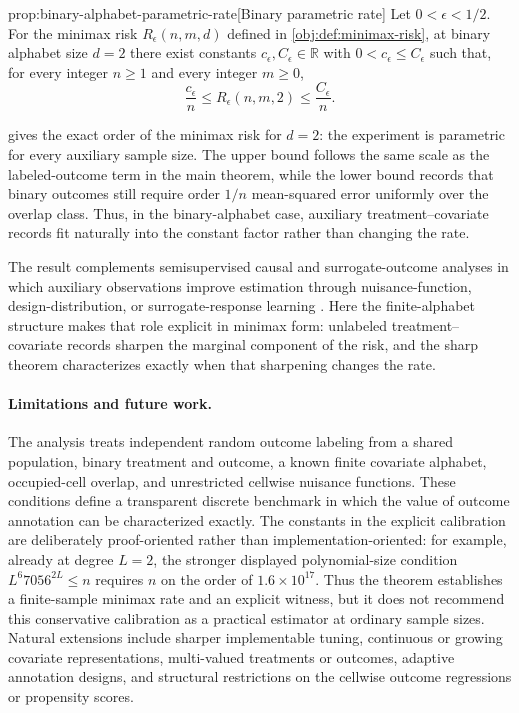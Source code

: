 \begin{theoremv}{prop:binary-alphabet-parametric-rate}[Binary parametric rate]
Let \(0<\epsilon<1/2\). For the minimax risk \(R_\epsilon(n,m,d)\) defined in \cref{obj:def:minimax-risk}, at binary alphabet size \(d=2\) there exist constants \(c_\epsilon,C_\epsilon\in\mathbb R\) with \(0<c_\epsilon\le C_\epsilon\) such that, for every integer \(n\ge1\) and every integer \(m\ge0\),
\[
\frac{c_\epsilon}{n}\le R_\epsilon(n,m,2)\le \frac{C_\epsilon}{n}.
\]
\end{theoremv}

 gives the exact order of the minimax risk for \(d=2\): the experiment is parametric for every auxiliary sample size. The upper bound follows the same scale as the labeled-outcome term in the main theorem, while the lower bound records that binary outcomes still require order \(1/n\) mean-squared error uniformly over the overlap class. Thus, in the binary-alphabet case, auxiliary treatment--covariate records fit naturally into the constant factor rather than changing the rate.

The result complements semisupervised causal and surrogate-outcome analyses in which auxiliary observations improve estimation through nuisance-function, design-distribution, or surrogate-response learning \citep{ChengAnanthakrishnanCai2021,ChakraborttyDai2024,KallusMao2025}. Here the finite-alphabet structure makes that role explicit in minimax form: unlabeled treatment--covariate records sharpen the marginal component of the risk, and the sharp theorem characterizes exactly when that sharpening changes the rate.

\paragraph{Limitations and future work.}
The analysis treats independent random outcome labeling from a shared population, binary treatment and outcome, a known finite covariate alphabet, occupied-cell overlap, and unrestricted cellwise nuisance functions. These conditions define a transparent discrete benchmark in which the value of outcome annotation can be characterized exactly. The constants in the explicit calibration are deliberately proof-oriented rather than implementation-oriented: for example, already at degree \(L=2\), the stronger displayed polynomial-size condition \(L^6 7056^{2L}\le n\) requires \(n\) on the order of \(1.6\times10^{17}\). Thus the theorem establishes a finite-sample minimax rate and an explicit witness, but it does not recommend this conservative calibration as a practical estimator at ordinary sample sizes. Natural extensions include sharper implementable tuning, continuous or growing covariate representations, multi-valued treatments or outcomes, adaptive annotation designs, and structural restrictions on the cellwise outcome regressions or propensity scores.
